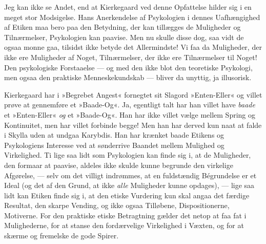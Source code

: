 \documentclass[12pt,a4paper,openany]{book}
\newcommand{\opage}[1]{\marginnote{\footnotesize\textit{[#1]}}}
\begin{document}
Jeg kan ikke se Andet, end at Kierkegaard ved
denne Opfattelse hilder sig i en meget stor Modsigelse.
Hans Anerkendelse af Psykologien i dennes Uafhængighed
af Etiken maa bero paa den Betydning, der kan tillægges
de Muligheder og Tilnærmelser, Psykologien kan
paavise. Men nu skulle disse dog, saa vidt de ogsaa
monne gaa, tilsidst ikke betyde det Allermindste! Vi
faa da Muligheder, der ikke ere Muligheder af Noget,
Tilnærmelser, der ikke ere Tilnærmelser til Noget! Den
psykologiske Forstaaelse --- og med den ikke blot den
teoretiske Psykologi, men ogsaa den praktiske Menneskekundskab
--- bliver da unyttig, ja illusorisk.

\opage{77}Kierkegaard har i »Begrebet Angest« fornegtet sit
Slagord »Enten-Eller« og villet prøve at gennemføre et
»Baade-Og«. Ja, egentligt talt har han villet have \textit{baade}
et »Enten-Eller« \textit{og} et »Baade-Og«. Han har ikke villet
vælge mellem Spring og Kontinuitet, men har villet forbinde
begge! Men han har derved kun naat at falde i
Skylla uden at undgaa Karybdis. Han har krænket
baade Etikens og Psykologiens Interesse ved at sønderrive
Baandet mellem Mulighed og Virkelighed. Ti lige
saa lidt som Psykologien kan finde sig i, at de Muligheder,
den formaar at paavise, aldeles ikke skulde kunne
begrunde den virkelige Afgørelse, --- selv om det villigt
indrømmes, at en fuldstændig Bégrundelse er et Ideal
(og det af den Grund, at ikke \textit{alle} Muligheder kunne
opdages), --- lige saa lidt kan Etiken finde sig i, at den
etiske Vurdering kun skal angaa det færdige Resultat,
den skarpe Vending, og ikke ogsaa Tilløbene, Dispositionerne,
Motiverne. For den praktiske etiske Betragtning
gælder det netop at faa fat i Mulighederne, for at stanse
den fordærvelige Virkelighed i Væxten, og for at skærme
og fremelske de gode Spirer.
\end{document}

